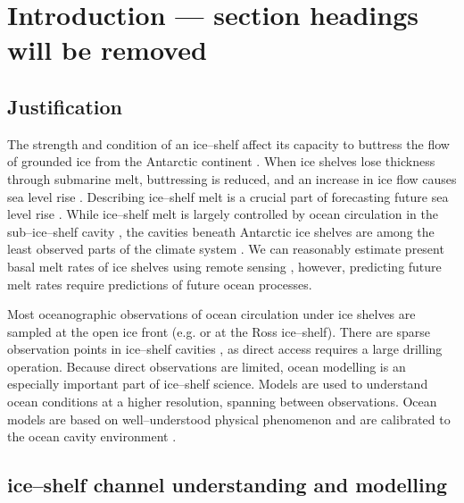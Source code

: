 
\section{Introduction --- section headings will be removed}

\subsection{Justification}

The strength and condition of an ice--shelf affect its capacity to buttress the flow of grounded ice from the Antarctic continent \citep{gagliardini2010coupling}. When ice shelves lose thickness through submarine melt, buttressing is reduced, and an increase in ice flow causes sea level rise \citep{pritchard2012antarctic}.
Describing ice--shelf melt is a crucial part of forecasting future sea level rise \citep{liu2015ocean,scambos2017much}.  While ice--shelf melt is largely controlled by ocean circulation in the sub--ice--shelf cavity \citep{rignot2013ice}, the cavities beneath Antarctic ice shelves are among the least observed parts of the climate system \citep{stevens2020ocean}. We can reasonably estimate present basal melt rates of ice shelves using remote sensing \citep[e.g][]{rignot2013ice,mankoff2012role,goldberg2019accurately}, however, predicting future melt rates require predictions of future ocean processes. 

Most oceanographic observations of ocean circulation under ice shelves are sampled at the open ice front 
(e.g. \cite{arzeno2014ocean} or \cite{smethie2005circulation} at the Ross ice--shelf). There are sparse observation points in ice--shelf cavities \citep[e.g.][]{begeman2018ocean,stevens2020ocean,foster1983temperature}, as direct access requires a large drilling operation. 
Because direct observations are limited, ocean modelling is an especially important part of ice--shelf science. Models are used to understand ocean conditions at a higher resolution, spanning between observations.  Ocean models are based on well--understood physical phenomenon  and are calibrated to the ocean cavity environment \citep[e.g.][]{millgate2013effect, holland2003modelling}. 


\subsection{ice--shelf channel understanding and modelling}

